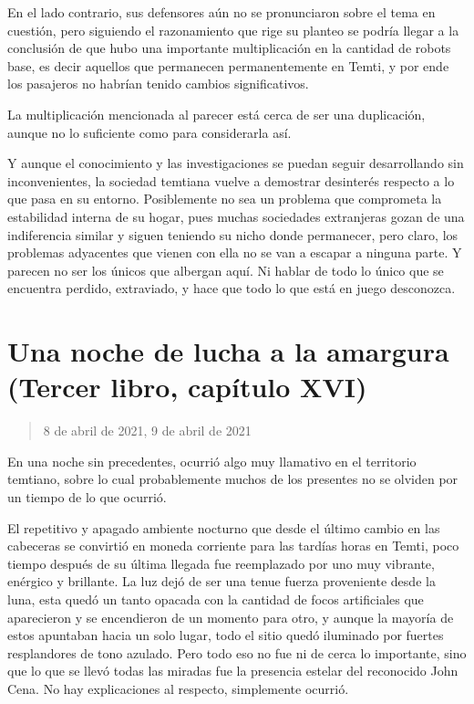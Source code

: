 \documentclass[
  spanish,
]{book}
\begin{document}
En el lado contrario, sus defensores aún no se pronunciaron sobre el tema en cuestión, pero siguiendo el razonamiento que rige su planteo se podría llegar a la conclusión de que hubo una importante multiplicación en la cantidad de robots base, es decir aquellos que permanecen permanentemente en Temti, y por ende los pasajeros no habrían tenido cambios significativos.

La multiplicación mencionada al parecer está cerca de ser una duplicación, aunque no lo suficiente como para considerarla así.

Y aunque el conocimiento y las investigaciones se puedan seguir desarrollando sin inconvenientes, la sociedad temtiana vuelve a demostrar desinterés respecto a lo que pasa en su entorno. Posiblemente no sea un problema que comprometa la estabilidad interna de su hogar, pues muchas sociedades extranjeras gozan de una indiferencia similar y siguen teniendo su nicho donde permanecer, pero claro, los problemas adyacentes que vienen con ella no se van a escapar a ninguna parte. Y parecen no ser los únicos que albergan aquí. Ni hablar de todo lo único que se encuentra perdido, extraviado, y hace que todo lo que está en juego desconozca.

\hypertarget{una-noche-de-lucha-a-la-amargura-tercer-libro-capuxedtulo-xvi}{%
\section{Una noche de lucha a la amargura (Tercer libro, capítulo XVI)}\label{una-noche-de-lucha-a-la-amargura-tercer-libro-capuxedtulo-xvi}}

\begin{quote}
8 de abril de 2021, 9 de abril de 2021
\end{quote}

En una noche sin precedentes, ocurrió algo muy llamativo en el territorio temtiano, sobre lo cual probablemente muchos de los presentes no se olviden por un tiempo de lo que ocurrió.

El repetitivo y apagado ambiente nocturno que desde el último cambio en las cabeceras se convirtió en moneda corriente para las tardías horas en Temti, poco tiempo después de su última llegada fue reemplazado por uno muy vibrante, enérgico y brillante. La luz dejó de ser una tenue fuerza proveniente desde la luna, esta quedó un tanto opacada con la cantidad de focos artificiales que aparecieron y se encendieron de un momento para otro, y aunque la mayoría de estos apuntaban hacia un solo lugar, todo el sitio quedó iluminado por fuertes resplandores de tono azulado. Pero todo eso no fue ni de cerca lo importante, sino que lo que se llevó todas las miradas fue la presencia estelar del reconocido John Cena. No hay explicaciones al respecto, simplemente ocurrió.
\end{document}
